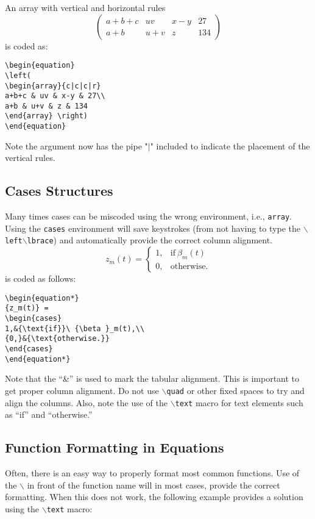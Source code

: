 \documentclass[lettersize,journal]{IEEEtran}
\begin{document}
An array with vertical and horizontal rules
\begin{equation}
\left( \begin{array}{c|c|c|r}
a+b+c & uv & x-y & 27\\ \hline
a+b & u+v & z & 134
\end{array}\right)
\end{equation}
is coded as:
\begin{verbatim}
\begin{equation}
\left(
\begin{array}{c|c|c|r}
a+b+c & uv & x-y & 27\\
a+b & u+v & z & 134
\end{array} \right)
\end{equation}
\end{verbatim}
Note the argument now has the pipe "$\vert$" included to indicate the placement of the vertical rules.


\subsection{Cases Structures}
Many times cases can be miscoded using the wrong environment, i.e., {\tt{array}}. Using the {\tt{cases}} environment will save keystrokes (from not having to type the $\backslash${\tt{left}}$\backslash${\tt{lbrace}}) and automatically provide the correct column alignment.
\begin{equation*}
{z_m(t)} = \begin{cases}
1,&{\text{if}}\ {\beta }_m(t) \\ 
{0,}&{\text{otherwise.}} 
\end{cases}
\end{equation*}
\noindent is coded as follows:
\begin{verbatim}
\begin{equation*}
{z_m(t)} = 
\begin{cases}
1,&{\text{if}}\ {\beta }_m(t),\\ 
{0,}&{\text{otherwise.}} 
\end{cases}
\end{equation*}
\end{verbatim}
\noindent Note that the ``\&'' is used to mark the tabular alignment. This is important to get  proper column alignment. Do not use $\backslash${\tt{quad}} or other fixed spaces to try and align the columns. Also, note the use of the $\backslash${\tt{text}} macro for text elements such as ``if'' and ``otherwise.''

\subsection{Function Formatting in Equations}
Often, there is an easy way to properly format most common functions. Use of the $\backslash$ in front of the function name will in most cases, provide the correct formatting. When this does not work, the following example provides a solution using the $\backslash${\tt{text}} macro:
\end{document}
